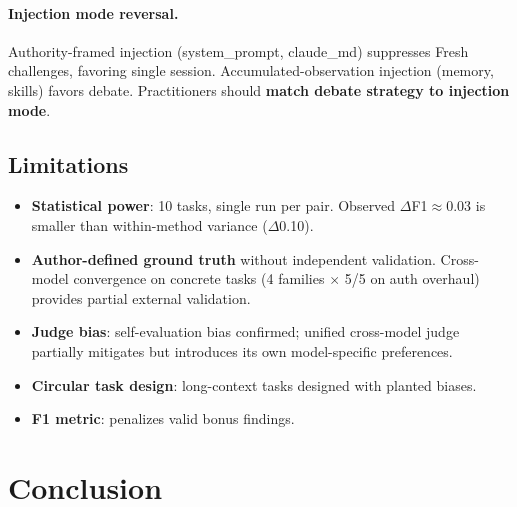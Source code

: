 \documentclass{article}
\begin{document}
\paragraph{Injection mode reversal.} Authority-framed injection (system\_prompt, claude\_md) suppresses Fresh challenges, favoring single session. Accumulated-observation injection (memory, skills) favors debate. Practitioners should \textbf{match debate strategy to injection mode}.

\subsection{Limitations}
\label{sec:limitations}

\begin{itemize}[leftmargin=1.5em, itemsep=1pt]
  \item \textbf{Statistical power}: 10 tasks, single run per pair. Observed $\Delta$F1$\approx$0.03 is smaller than within-method variance ($\Delta$0.10).
  \item \textbf{Author-defined ground truth} without independent validation. Cross-model convergence on concrete tasks (4 families $\times$ 5/5 on auth overhaul) provides partial external validation.
  \item \textbf{Judge bias}: self-evaluation bias confirmed; unified cross-model judge partially mitigates but introduces its own model-specific preferences.
  \item \textbf{Circular task design}: long-context tasks designed with planted biases.
  \item \textbf{F1 metric}: penalizes valid bonus findings.
\end{itemize}

\section{Conclusion}
\label{sec:conclusion}
\end{document}
